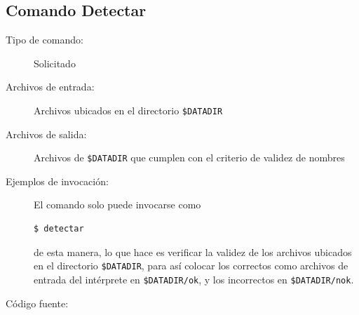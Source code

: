 \documentclass[12pt]{article}
\begin{document}
\subsection{Comando Detectar}
\begin{description}
	\item [Tipo de comando:] Solicitado
	
	\item [Archivos de entrada:] Archivos ubicados en el directorio \verb|$DATADIR|
	
	\item [Archivos de salida:] Archivos de \verb|$DATADIR| que cumplen con el criterio de validez de nombres
	
	\item [Ejemplos de invocación:]	El comando solo puede invocarse como
	\begin{verbatim}$ detectar\end{verbatim}
	de esta manera, lo que hace es verificar la validez de los archivos ubicados en el directorio \verb|$DATADIR|, para así colocar los correctos como archivos de entrada del intérprete en \verb|$DATADIR/ok|, y los incorrectos en \verb|$DATADIR/nok|.
	
	\item [Código fuente:]
\end{description}
{\footnotesize

}
\end{document}
